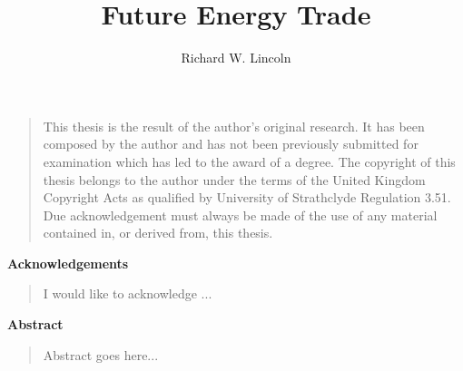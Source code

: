 \documentclass[oneside,11pt]{strath_thesis}
\title{Future Energy Trade}
\author{Richard W. Lincoln}
\begin{document}
\maketitle
\newpage

\frontmatter   %

\thispagestyle{plain}
\begin{quote}
This thesis is the result of the author's original research.  It has been
composed by the author and has not been previously submitted for examination
which has led to the award of a degree.
The copyright of this thesis belongs to the author under the terms of the
United Kingdom Copyright Acts as qualified by University of Strathclyde
Regulation 3.51. Due acknowledgement must always be made of the use of any
material contained in, or derived from, this thesis.
\end{quote}
\newpage

\thispagestyle{plain}
\begin{center}
\vspace*{1.5cm}
{\Large \bfseries Acknowledgements}
\end{center}
\vspace{0.5cm}
\begin{quote}
I would like to acknowledge ...
\end{quote}
\newpage

\thispagestyle{plain}
\begin{center}
  \vspace*{1.5cm}
  {\Large \bfseries  Abstract}
\end{center}
\vspace{0.5cm}
\begin{quote}
Abstract goes here...
\end{quote}

\tableofcontents
\listoffigures

\mainmatter   %








%








\end{document}
